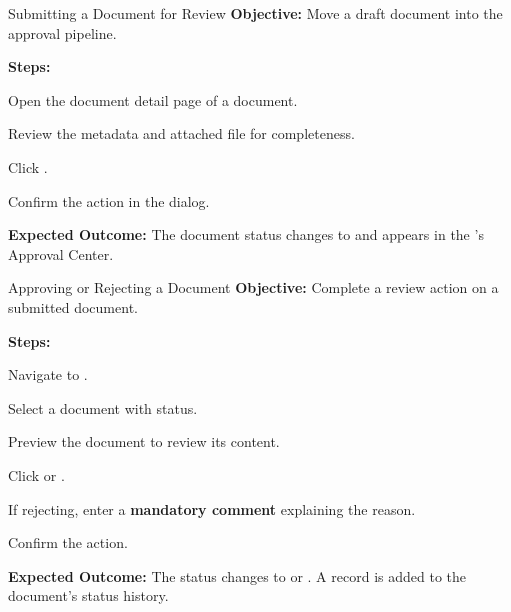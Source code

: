 \vspace{8pt}

\begin{ugTask}{Submitting a Document for Review}
  \textbf{Objective:} Move a draft document into the approval
  pipeline.

  \textbf{Steps:}
  \begin{ugSteps}
    \item Open the document detail page of a
           document.
    \item Review the metadata and attached file for completeness.
    \item Click .
    \item Confirm the action in the dialog.
  \end{ugSteps}

  \textbf{Expected Outcome:} The document status changes to
   and appears in the
  's Approval Center.
\end{ugTask}

\vspace{8pt}

\begin{ugTask}{Approving or Rejecting a Document}
  \textbf{Objective:} Complete a review action on a submitted
  document.

  \textbf{Steps:}
  \begin{ugSteps}
    \item Navigate to .
    \item Select a document with 
          status.
    \item Preview the document to review its content.
    \item Click  or .
    \item If rejecting, enter a \textbf{mandatory comment}
          explaining the reason.
    \item Confirm the action.
  \end{ugSteps}

  \textbf{Expected Outcome:} The status changes to
   or .
  A record is added to the document's status history.
\end{ugTask}

\vspace{8pt}


